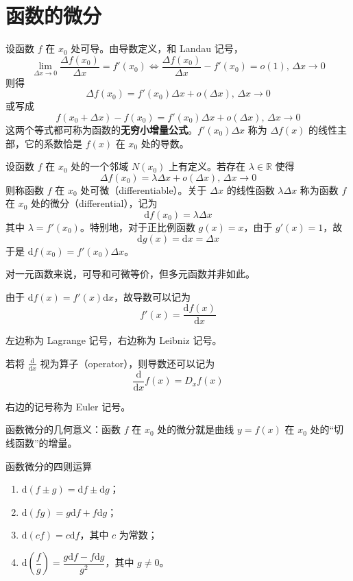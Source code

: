 
\section{函数的微分}

设函数 $f$ 在 $x_0$ 处可导。由导数定义，和 Landau 记号，
\[\lim_{\Delta x\to 0}\frac{\Delta f(x_0)}{\Delta x} = f'(x_0) \iff \frac{\Delta f(x_0)}{\Delta x} - f'(x_0) = o(1),\, \Delta x\to 0\]
则得
\begin{equation}
    \Delta f(x_0) = f'(x_0)\Delta x + o(\Delta x),\, \Delta x\to 0
\end{equation}
或写成
\begin{equation}
    f(x_0 + \Delta x) - f(x_0) = f'(x_0)\Delta x + o(\Delta x),\, \Delta x\to 0
\end{equation}
这两个等式都可称为函数的\textbf{无穷小增量公式}。$f'(x_0)\Delta x$ 称为 $\Delta f(x)$ 的线性主部，它的系数恰是 $f(x)$ 在 $x_0$ 处的导数。

\begin{definition}
    设函数 $f$ 在 $x_0$ 处的一个邻域 $N(x_0)$ 上有定义。若存在 $\lambda\in \mathbb{R}$ 使得
    \[\Delta f(x_0) = \lambda\Delta x + o(\Delta x),\, \Delta x\to 0\]
    则称函数 $f$ 在 $x_0$ 处可微（differentiable）。关于 $\Delta x$ 的线性函数 $\lambda\Delta x$ 称为函数 $f$ 在 $x_0$ 处的微分（differential），记为
    \[\mathrm{d}f(x_0) = \lambda\Delta x\]
    其中 $\lambda = f'(x_0)$。特别地，对于正比例函数 $g(x) = x$，由于 $g'(x) = 1$，故
    \[\mathrm{d}g(x) = \mathrm{d}x = \Delta x\]
    于是 $\mathrm{d}f(x_0) = f'(x_0)\Delta x$。
\end{definition}

对一元函数来说，可导和可微等价，但多元函数并非如此。

由于 $\mathrm{d}f(x) = f'(x)\mathrm{d}x$，故导数可以记为
\begin{equation}
    f'(x) = \frac{\mathrm{d}f(x)}{\mathrm{d}x}
\end{equation}

左边称为 Lagrange 记号，右边称为 Leibniz 记号。

若将 $\displaystyle \frac{\mathrm{d}}{\mathrm{d}x}$ 视为算子（operator），则导数还可以记为
\[\frac{\mathrm{d}}{\mathrm{d}x}f(x) = D_{x}f(x)\]

右边的记号称为 Euler 记号。

函数微分的几何意义：函数 $f$ 在 $x_0$ 处的微分就是曲线 $y = f(x)$ 在 $x_0$ 处的“切线函数”的增量。

\begin{theorem}
    函数微分的四则运算
    \begin{enumerate}
        \item $\mathrm{d}(f \pm g) = \mathrm{d}f \pm \mathrm{d}g$；
        \item $\mathrm{d}(fg) = g\mathrm{d}f + f\mathrm{d}g$；
        \item $\mathrm{d}(cf) = c\mathrm{d}f$，其中 $c$ 为常数；
        \item $\mathrm{d}\left(\dfrac{f}{g}\right) = \dfrac{g\mathrm{d}f - f\mathrm{d}g}{g^2}$，其中 $g \ne 0$。
    \end{enumerate}
\end{theorem}

